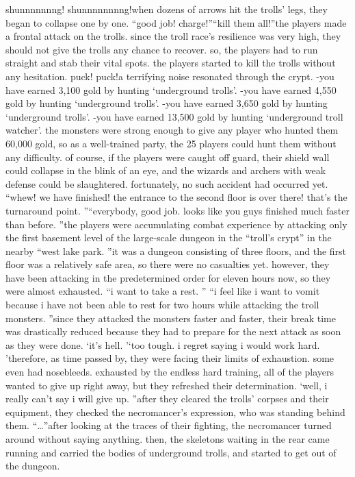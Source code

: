shunnnnnnng! shunnnnnnnng!when dozens of arrows hit the trolls’ legs, they began to collapse one by one.
“good job! charge!”“kill them all!”the players made a frontal attack on the trolls.
 since the troll race’s resilience was very high, they should not give the trolls any chance to recover.
 so, the players had to run straight and stab their vital spots.
 the players started to kill the trolls without any hesitation.
puck! puck!a terrifying noise resonated through the crypt.
-you have earned 3,100 gold by hunting ‘underground trolls’.
-you have earned 4,550 gold by hunting ‘underground trolls’.
-you have earned 3,650 gold by hunting ‘underground trolls’.
-you have earned 13,500 gold by hunting ‘underground troll watcher’.
the monsters were strong enough to give any player who hunted them 60,000 gold, so as a well-trained party, the 25 players could hunt them without any difficulty.
of course, if the players were caught off guard, their shield wall could collapse in the blink of an eye, and the wizards and archers with weak defense could be slaughtered.
 fortunately, no such accident had occurred yet.
“whew! we have finished! the entrance to the second floor is over there! that’s the turnaround point.
”“everybody, good job.
 looks like you guys finished much faster than before.
”the players were accumulating combat experience by attacking only the first basement level of the large-scale dungeon in the “troll’s crypt” in the nearby “west lake park.
”it was a dungeon consisting of three floors, and the first floor was a relatively safe area, so there were no casualties yet.
however, they have been attacking in the predetermined order for eleven hours now, so they were almost exhausted.
“i want to take a rest.
”
“i feel like i want to vomit because i have not been able to rest for two hours while attacking the troll monsters.
”since they attacked the monsters faster and faster, their break time was drastically reduced because they had to prepare for the next attack as soon as they were done.
‘it’s hell.
’‘too tough.
 i regret saying i would work hard.
’therefore, as time passed by, they were facing their limits of exhaustion.
some even had nosebleeds.
exhausted by the endless hard training, all of the players wanted to give up right away, but they refreshed their determination.
‘well, i really can’t say i will give up.
”after they cleared the trolls’ corpses and their equipment, they checked the necromancer’s expression, who was standing behind them.
“…”after looking at the traces of their fighting, the necromancer turned around without saying anything.
then, the skeletons waiting in the rear came running and carried the bodies of underground trolls, and started to get out of the dungeon.

